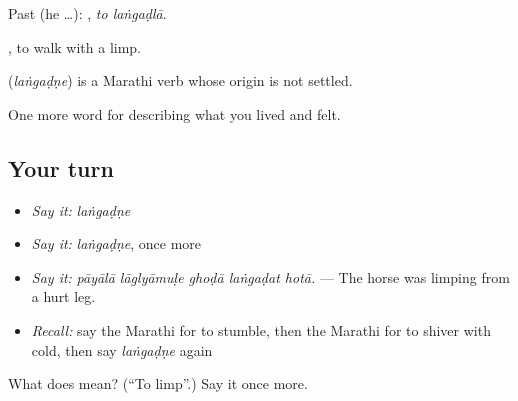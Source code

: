 Past (he …):  , \emph{to laṅgaḍlā}.

 , to walk with a limp.

\begin{cousinweb}
\textbf{} (\emph{laṅgaḍṇe}) is a Marathi verb whose origin is not settled.
\end{cousinweb}

\begin{grammarlens}[title={What you've built}]
One more word for describing what you lived and felt.
\end{grammarlens}

\subsection*{Your turn}
\begin{itemize}
\raggedright
  \item \emph{Say it:} \emph{laṅgaḍṇe}
  \item \emph{Say it:} \emph{laṅgaḍṇe}, once more
  \item \emph{Say it:} \emph{pāyālā lāglyāmuḷe ghoḍā laṅgaḍat hotā.} — The horse was limping from a hurt leg.
  \item \emph{Recall:} say the Marathi for to stumble, then the Marathi for to shiver with cold, then say \emph{laṅgaḍṇe} again
\end{itemize}

\begin{tcolorbox}[breakable,colback=teal!4,colframe=teal!35!black,title={Before you move on}]
What does  mean? (\textquotedblleft{}To limp\textquotedblright{}.) Say it once more.
\end{tcolorbox}
